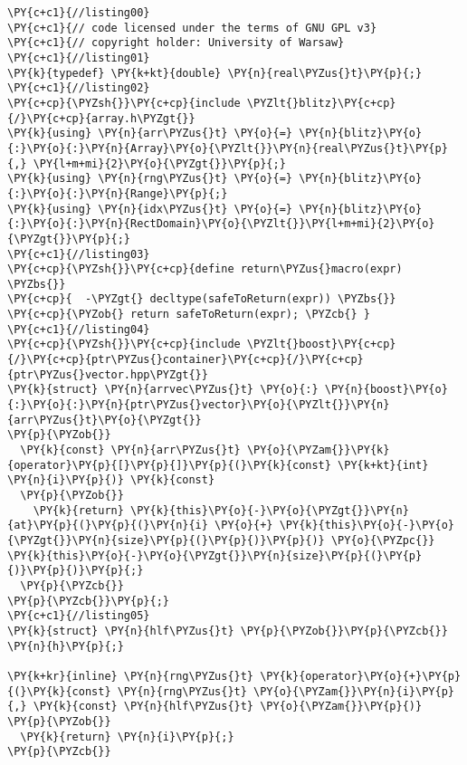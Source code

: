 \begin{Verbatim}[commandchars=\\\{\}]
\PY{c+c1}{//listing00}
\PY{c+c1}{// code licensed under the terms of GNU GPL v3}
\PY{c+c1}{// copyright holder: University of Warsaw}
\PY{c+c1}{//listing01}
\PY{k}{typedef} \PY{k+kt}{double} \PY{n}{real\PYZus{}t}\PY{p}{;}
\PY{c+c1}{//listing02}
\PY{c+cp}{\PYZsh{}}\PY{c+cp}{include \PYZlt{}blitz}\PY{c+cp}{/}\PY{c+cp}{array.h\PYZgt{}}
\PY{k}{using} \PY{n}{arr\PYZus{}t} \PY{o}{=} \PY{n}{blitz}\PY{o}{:}\PY{o}{:}\PY{n}{Array}\PY{o}{\PYZlt{}}\PY{n}{real\PYZus{}t}\PY{p}{,} \PY{l+m+mi}{2}\PY{o}{\PYZgt{}}\PY{p}{;}
\PY{k}{using} \PY{n}{rng\PYZus{}t} \PY{o}{=} \PY{n}{blitz}\PY{o}{:}\PY{o}{:}\PY{n}{Range}\PY{p}{;}
\PY{k}{using} \PY{n}{idx\PYZus{}t} \PY{o}{=} \PY{n}{blitz}\PY{o}{:}\PY{o}{:}\PY{n}{RectDomain}\PY{o}{\PYZlt{}}\PY{l+m+mi}{2}\PY{o}{\PYZgt{}}\PY{p}{;}
\PY{c+c1}{//listing03}
\PY{c+cp}{\PYZsh{}}\PY{c+cp}{define return\PYZus{}macro(expr) \PYZbs{}}
\PY{c+cp}{  -\PYZgt{} decltype(safeToReturn(expr)) \PYZbs{}}
\PY{c+cp}{\PYZob{} return safeToReturn(expr); \PYZcb{} }
\PY{c+c1}{//listing04}
\PY{c+cp}{\PYZsh{}}\PY{c+cp}{include \PYZlt{}boost}\PY{c+cp}{/}\PY{c+cp}{ptr\PYZus{}container}\PY{c+cp}{/}\PY{c+cp}{ptr\PYZus{}vector.hpp\PYZgt{}}
\PY{k}{struct} \PY{n}{arrvec\PYZus{}t} \PY{o}{:} \PY{n}{boost}\PY{o}{:}\PY{o}{:}\PY{n}{ptr\PYZus{}vector}\PY{o}{\PYZlt{}}\PY{n}{arr\PYZus{}t}\PY{o}{\PYZgt{}} 
\PY{p}{\PYZob{}}
  \PY{k}{const} \PY{n}{arr\PYZus{}t} \PY{o}{\PYZam{}}\PY{k}{operator}\PY{p}{[}\PY{p}{]}\PY{p}{(}\PY{k}{const} \PY{k+kt}{int} \PY{n}{i}\PY{p}{)} \PY{k}{const} 
  \PY{p}{\PYZob{}}   
    \PY{k}{return} \PY{k}{this}\PY{o}{-}\PY{o}{\PYZgt{}}\PY{n}{at}\PY{p}{(}\PY{p}{(}\PY{n}{i} \PY{o}{+} \PY{k}{this}\PY{o}{-}\PY{o}{\PYZgt{}}\PY{n}{size}\PY{p}{(}\PY{p}{)}\PY{p}{)} \PY{o}{\PYZpc{}} \PY{k}{this}\PY{o}{-}\PY{o}{\PYZgt{}}\PY{n}{size}\PY{p}{(}\PY{p}{)}\PY{p}{)}\PY{p}{;} 
  \PY{p}{\PYZcb{}}
\PY{p}{\PYZcb{}}\PY{p}{;}
\PY{c+c1}{//listing05}
\PY{k}{struct} \PY{n}{hlf\PYZus{}t} \PY{p}{\PYZob{}}\PY{p}{\PYZcb{}} \PY{n}{h}\PY{p}{;}

\PY{k+kr}{inline} \PY{n}{rng\PYZus{}t} \PY{k}{operator}\PY{o}{+}\PY{p}{(}\PY{k}{const} \PY{n}{rng\PYZus{}t} \PY{o}{\PYZam{}}\PY{n}{i}\PY{p}{,} \PY{k}{const} \PY{n}{hlf\PYZus{}t} \PY{o}{\PYZam{}}\PY{p}{)} 
\PY{p}{\PYZob{}} 
  \PY{k}{return} \PY{n}{i}\PY{p}{;} 
\PY{p}{\PYZcb{}} 


\end{Verbatim}

